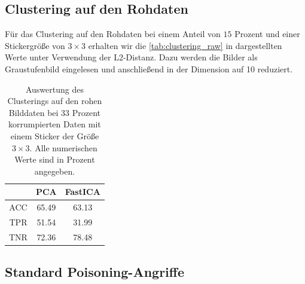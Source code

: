 \documentclass[11pt,a4paper]{article}
\numberwithin{equation}{section}
\begin{document}
	\subsection{Clustering auf den Rohdaten}
	Für das Clustering auf den Rohdaten bei einem Anteil von $15$ Prozent und einer Stickergröße von $3 \times 3$ erhalten wir die \autoref{tab:clustering_raw} in dargestellten Werte unter Verwendung der L2-Distanz. Dazu werden die Bilder als Graustufenbild eingelesen und anschließend in der Dimension auf 10 reduziert.
	\begin{table}[ht]
		\begin{center}
				\begin{tabular}{c|c|c}
					& PCA & FastICA \\ \hline
					ACC	 & 	65.49 & 63.13 \\
					TPR		& 51.54 & 31.99 \\
					TNR	& 72.36 	&78.48 	 
				\end{tabular}
				\caption[Auswertung des Clusterings auf den rohen Bilddaten]{Auswertung des Clusterings auf den rohen Bilddaten bei 33 Prozent korrumpierten Daten mit einem Sticker der Größe $3 \times 3$. Alle numerischen Werte sind in Prozent angegeben.}	
				\label{tab:clustering_raw}
			
			
		\end{center}
	\end{table}
	
	\subsection{Standard Poisoning-Angriffe}
	
\end{document}
